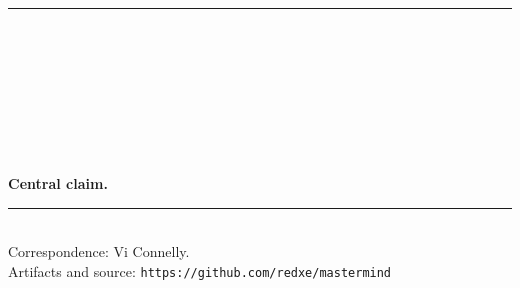 \begin{titlepage}
  \centering
  \vspace*{0.75in}
  {\color{quantum}\rule{0.82\textwidth}{1.2pt}}\\[1.0cm]
  {\fontsize{25}{30}\selectfont\bfseries\color{ink}
  \PaperTitle\\[0.22cm]}
  {\Large\color{quantumdark}
  \PaperSubtitle\\[0.55cm]}
  {\large\itshape\color{ink}
  \PaperTagline}
  \\[1.35cm]
  {\Large\bfseries \PaperAuthor}\\[0.2cm]
  {\normalsize \PaperAffiliation}\\[0.15cm]
  {\normalsize \PaperDate}\\[1.2cm]

  \begin{tcolorbox}[
    width=0.82\textwidth,
    colback=softgray,
    colframe=ink,
    boxrule=0.45pt,
    arc=1mm,
    left=4mm,right=4mm,top=3mm,bottom=3mm]
  \small
  \textbf{Central claim.} \PaperCentralClaim
  \end{tcolorbox}

  \vfill
  {\color{quantum}\rule{0.82\textwidth}{1.2pt}}\\[0.25cm]
  {\small Correspondence: Vi Connelly.\\
  Artifacts and source: \texttt{https://github.com/redxe/mastermind}}
\end{titlepage}
